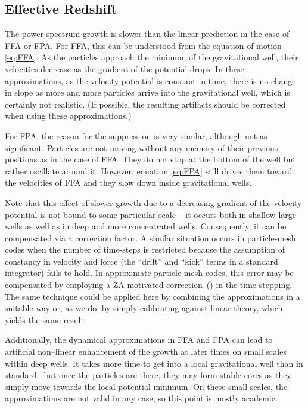 \subsection{Effective Redshift}
\label{sec:z_eff}
The power spectrum growth is slower than the linear prediction in the case of FFA or FPA. For FFA, this can be understood from the equation of motion \eqref{eq:FFA}. As the particles approach the minimum of the gravitational well, their velocities decrease as the gradient of the potential drops. In these approximations, as the velocity potential is constant in time, there is no change in slope as more and more particles arrive into the gravitational well, which is certainly not realistic. (If possible, the resulting artifacts should be corrected when using these approximations.)

For FPA, the reason for the suppression is very similar, although not as significant. Particles are not moving without any memory of their previous positions as in the case of FFA. They do not stop at the bottom of the well but rather oscillate around it. However, equation \eqref{eq:FPA} still drives them toward the velocities of FFA and they slow down inside gravitational wells.

Note that this effect of slower growth due to a decreasing gradient of the velocity potential is not bound to some particular scale -- it occurs both in shallow large wells as well as in deep and more concentrated wells. Consequently, it can be compensated via a correction factor. A similar situation occurs in particle-mesh codes when the number of time-steps is restricted because the assumption of constancy in velocity and force (the ``drift'' and ``kick'' terms in a standard integrator) fails to hold. In approximate particle-mesh codes, this error may be compensated by employing a ZA-motivated correction~(\cite{Ref:Feng}) in the time-stepping. The same technique could be applied here by combining the approximations in a suitable way or, as we do, by simply calibrating against linear theory, which yields the same result.

Additionally, the dynamical approximations in FFA and FPA can lead to artificial non--linear enhancement of the growth at later times on small scales within deep wells. It takes more time to get into a local gravitational well than in standard \nbody\ but once the particles are there, they may form stable cores as they simply move towards the local potential minimum. On these small scales, the approximations are not valid in any case, so this point is mostly academic.


